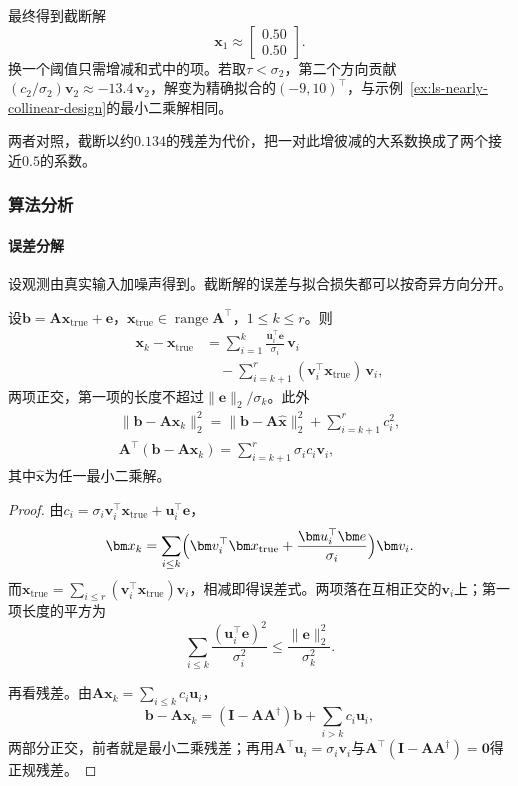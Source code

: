 最终得到截断解
\[
 \bm x_1\approx\begin{bmatrix}0.50\\0.50\end{bmatrix}.
\]
换一个阈值只需增减和式中的项。若取$\tau<\sigma_2$，第二个方向贡献$(c_2/\sigma_2)\bm v_2\approx-13.4\,\bm v_2$，解变为精确拟合的$(-9,10)^\top$，与示例~\ref{ex:ls-nearly-collinear-design}的最小二乘解相同。

两者对照，截断以约$0.134$的残差为代价，把一对此增彼减的大系数换成了两个接近$0.5$的系数。

\subsubsection{算法分析}

\paragraph{误差分解}
设观测由真实输入加噪声得到。截断解的误差与拟合损失都可以按奇异方向分开。

\begin{theorem}[截断SVD的误差分解]
\label{thm:ls-tsvd-error-decomposition}
设$\bm b=\bm A\bm x_{\mathrm{true}}+\bm e$，$\bm x_{\mathrm{true}}\in\operatorname{range}\bm A^\top$，$1\leq k\leq r$。则
\begin{equation}
 \begin{aligned}
 \bm x_k-\bm x_{\mathrm{true}}
 &=\sum_{i=1}^k\frac{\bm u_i^\top\bm e}{\sigma_i}\,\bm v_i\\
 &\quad-\sum_{i=k+1}^r(\bm v_i^\top\bm x_{\mathrm{true}})\,\bm v_i ,
 \end{aligned}
 \label{eq:ls-tsvd-error-decomposition}
\end{equation}
两项正交，第一项的长度不超过$\lVert\bm e\rVert_2/\sigma_k$。此外
\begin{equation}
 \begin{gathered}
 \lVert\bm b-\bm A\bm x_k\rVert_2^2=\lVert\bm b-\bm A\hat{\bm x}\rVert_2^2+\sum_{i=k+1}^rc_i^2,\\
 \bm A^\top(\bm b-\bm A\bm x_k)=\sum_{i=k+1}^r\sigma_ic_i\bm v_i ,
 \end{gathered}
 \label{eq:ls-tsvd-residual-decomposition}
\end{equation}
其中$\hat{\bm x}$为任一最小二乘解。
\end{theorem}
\begin{proof}
由$c_i=\sigma_i\bm v_i^\top\bm x_{\mathrm{true}}+\bm u_i^\top\bm e$，
\[
 \bm x_k=\sum_{i\leq k}\Bigl(\bm v_i^\top\bm x_{\mathrm{true}}+\frac{\bm u_i^\top\bm e}{\sigma_i}\Bigr)\bm v_i .
\]
而$\bm x_{\mathrm{true}}=\sum_{i\leq r}(\bm v_i^\top\bm x_{\mathrm{true}})\bm v_i$，相减即得误差式。两项落在互相正交的$\bm v_i$上；第一项长度的平方为
\[
 \sum_{i\leq k}\frac{(\bm u_i^\top\bm e)^2}{\sigma_i^2}\leq\frac{\lVert\bm e\rVert_2^2}{\sigma_k^2}.
\]

再看残差。由$\bm A\bm x_k=\sum_{i\leq k}c_i\bm u_i$，
\[
 \bm b-\bm A\bm x_k=(\bm I-\bm A\bm A^\dagger)\bm b+\sum_{i>k}c_i\bm u_i ,
\]
两部分正交，前者就是最小二乘残差；再用$\bm A^\top\bm u_i=\sigma_i\bm v_i$与$\bm A^\top(\bm I-\bm A\bm A^\dagger)=\bm0$得正规残差。
\end{proof}

